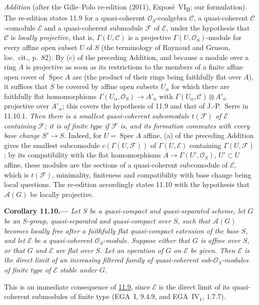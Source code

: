 \par\medskip\noindent
\emph{Addition} (after the Gille--Polo re-edition (2011), Expos\'e~VI\textsubscript{B}; our formulation).
The re-edition states 11.9 for a quasi-coherent \(\mathcal O_S\)-coalgebra \(\mathcal C\), a quasi-coherent
\(\mathcal C\)-comodule \(\mathcal E\) and a quasi-coherent submodule \(\mathcal F\) of \(\mathcal E\), under the
hypothesis that \(\mathcal C\) is \emph{locally projective}, that is, \(\Gamma(U,\mathcal C)\) is a projective
\(\Gamma(U,\mathcal O_S)\)-module for every affine open subset \(U\) of \(S\) (the terminology of Raynaud and Gruson,
loc.\ cit., p.~82). By (c) of the preceding Addition, and because a module over a ring \(A\) is projective as soon as
its restrictions to the members of a finite affine open cover of \(\operatorname{Spec}A\) are (the product of their
rings being faithfully flat over \(A\)), it suffices that \(S\) be covered by affine open subsets \(U_\alpha\) for which
there are faithfully flat homomorphisms \(\Gamma(U_\alpha,\mathcal O_S)\to A'_\alpha\) with
\(\Gamma(U_\alpha,\mathcal C)\otimes A'_\alpha\) projective over \(A'_\alpha\); this covers the hypothesis of 11.9 and
that of J.-P.~Serre in 11.10.1. \emph{Then there is a smallest quasi-coherent subcomodule \(t(\mathcal F)\) of
\(\mathcal E\) containing \(\mathcal F\); it is of finite type if \(\mathcal F\) is, and its formation commutes with
every base change \(S'\to S\).} Indeed, for \(U=\operatorname{Spec}A\) affine, (a) of the preceding Addition gives the
smallest subcomodule \(c(\Gamma(U,\mathcal F))\) of \(\Gamma(U,\mathcal E)\) containing \(\Gamma(U,\mathcal F)\); by its
compatibility with the flat homomorphisms \(A\to\Gamma(U',\mathcal O_S)\), \(U'\subset U\) affine, these modules are
the sections of a quasi-coherent subcomodule of \(\mathcal E\), which is \(t(\mathcal F)\), minimality, finiteness and
compatibility with base change being local questions. The re-edition accordingly states 11.10 with the hypothesis
that \(\mathcal A(G)\) be locally projective.

\medskip
{}\label{cor:sga3-VIB-11.10}%
\noindent\textbf{Corollary 11.10.---}
\emph{Let \(S\) be a quasi-compact and quasi-separated scheme,
let \(G\) be an \(S\)-group, quasi-separated and quasi-compact
over \(S\), such that \(\mathcal A(G)\) becomes locally free
after a faithfully flat quasi-compact extension of the base
\(S\), and let \(\mathcal E\) be a quasi-coherent
\(\mathcal O_S\)-module. Suppose either that \(G\) is affine
over \(S\), or that \(G\) and \(\mathcal E\) are flat over
\(S\). Let an operation of \(G\) on \(\mathcal E\) be given.
Then \(\mathcal E\) is the direct limit of an increasing
filtered family of quasi-coherent sub-\(\mathcal O_S\)-modules
of finite type of \(\mathcal E\) stable under \(G\).}

This is an immediate consequence of
\hyperref[prop:sga3-VIB-11.9]{11.9}, since \(\mathcal E\) is the
direct limit of its quasi-coherent submodules of finite type
\textup{(EGA~I, 9.4.9, and EGA~IV\(_1\), 1.7.7)}.
